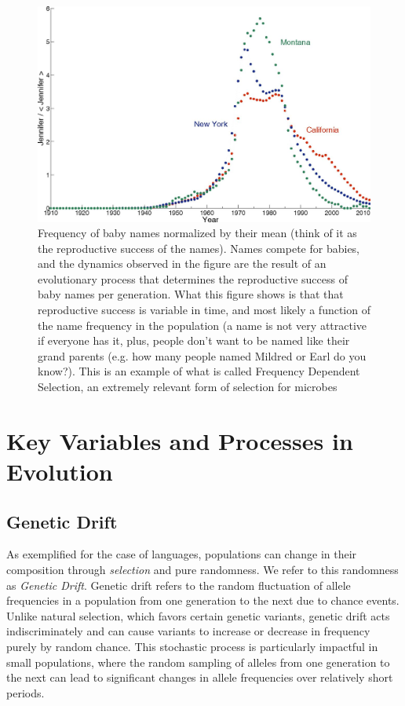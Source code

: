 \documentclass[10pt,a4paper]{scrbook}
\begin{document}
\begin{figure}
    \centering
    \includegraphics[width=0.75\linewidth]{Parisi.png}
    \caption{Frequency of baby names normalized by their mean (think of it as the reproductive success of the names). Names compete for babies, and the dynamics observed in the figure are the result of an evolutionary process that determines the reproductive success of baby names per generation. What this figure shows is that that reproductive success is variable in time, and most likely a function of the name frequency in the population (a name is not very attractive if everyone has it, plus, people don't want to be named like their grand parents (e.g. how many people named Mildred or Earl do you know?). This is an example of what is called Frequency Dependent Selection, an extremely relevant form of selection for microbes}
    \label{fig:enter-label}
\end{figure}

\chapter{Key Variables and Processes in Evolution}

\section{Genetic Drift}

As exemplified for the case of languages, populations can change in their composition through \emph{selection} and pure randomness. We refer to this randomness as \emph{Genetic Drift}. Genetic drift refers to the random fluctuation of allele frequencies in a population from one generation to the next due to chance events. Unlike natural selection, which favors certain genetic variants, genetic drift acts indiscriminately and can cause variants to increase or decrease in frequency purely by random chance. This stochastic process is particularly impactful in small populations, where the random sampling of alleles from one generation to the next can lead to significant changes in allele frequencies over relatively short periods.
\end{document}
